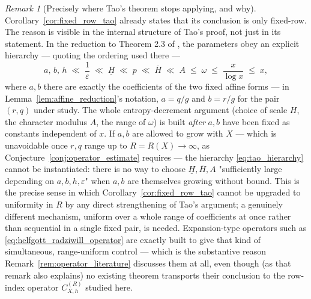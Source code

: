 \documentclass[11pt]{amsart}
\numberwithin{equation}{section}
\theoremstyle{plain}
\theoremstyle{definition}
\theoremstyle{remark}
\newtheorem{remark}[theorem]{Remark}
\begin{document}
\begin{remark}[Precisely where Tao's theorem stops applying, and why]
\label{rem:tao_hierarchy_precise}
Corollary~\ref{cor:fixed_row_tao} already states that its conclusion is only fixed-row.  The reason is visible in the internal structure of Tao's proof, not just in its statement.  In the reduction to Theorem 2.3 of \cite{Tao2016}, the parameters obey an explicit hierarchy — quoting the ordering used there —
\begin{equation}
a,\,b,\,h\;\ll\;\frac1\varepsilon\;\ll\;\underline H\;\ll\;p\;\ll\;\overline H\;\ll\;A\;\le\;\omega\;\le\;\frac x{\log x}\;\le\;x,
\label{eq:tao_hierarchy}
\end{equation}
where \(a,b\) there are exactly the coefficients of the two fixed affine forms — in Lemma~\ref{lem:affine_reduction}'s notation, \(a=q/g\) and \(b=r/g\) for the pair \((r,q)\) under study.  The whole entropy-decrement argument (choice of scale \(H\), the character modulus \(A\), the range of \(\omega\)) is built \emph{after} \(a,b\) have been fixed as constants independent of \(x\).  If \(a,b\) are allowed to grow with \(X\) — which is unavoidable once \(r,q\) range up to \(R=R(X)\to\infty\), as Conjecture~\ref{conj:operator_estimate} requires — the hierarchy \eqref{eq:tao_hierarchy} cannot be instantiated: there is no way to choose \(\underline H,\overline H,A\) "sufficiently large depending on \(a,b,h,\varepsilon\)" when \(a,b\) are themselves growing without bound. This is the precise sense in which Corollary~\ref{cor:fixed_row_tao} cannot be upgraded to uniformity in \(R\) by any direct strengthening of Tao's argument; a genuinely different mechanism, uniform over a whole range of coefficients at once rather than sequential in a single fixed pair, is needed. Expansion-type operators such as \eqref{eq:helfgott_radziwill_operator} are exactly built to give that kind of simultaneous, range-uniform control — which is the substantive reason Remark~\ref{rem:operator_literature} discusses them at all, even though (as that remark also explains) no existing theorem transports their conclusion to the row-index operator \(C_{X,h}^{(R)}\) studied here.
\end{remark}
\end{document}
